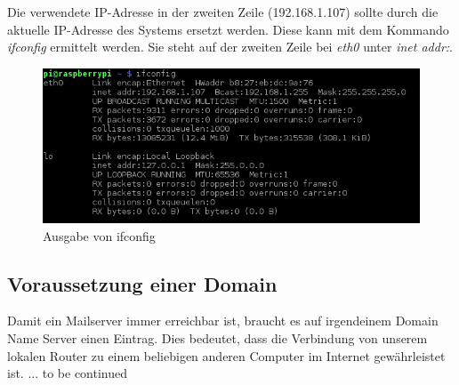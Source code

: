 Die verwendete IP-Adresse in der zweiten Zeile (192.168.1.107) sollte durch die aktuelle IP-Adresse des Systems ersetzt werden. Diese kann mit dem Kommando \textit{ifconfig} ermittelt werden. Sie steht auf der zweiten Zeile bei \textit{eth0} unter \textit{inet addr:}.

\begin{figure}[h]
\centering
\includegraphics[scale=0.65]{images/ifconfig}
\caption{Ausgabe von ifconfig}
\end{figure}

\subsection{Voraussetzung einer Domain}
Damit ein Mailserver immer erreichbar ist, braucht es auf irgendeinem Domain Name Server einen Eintrag. Dies bedeutet, dass die Verbindung von unserem lokalen Router zu einem beliebigen anderen Computer im Internet gewährleistet ist.
... to be continued






